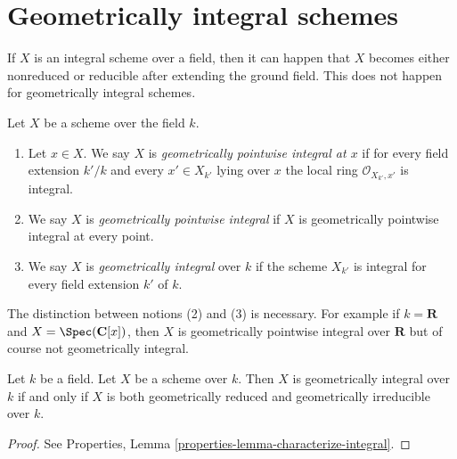 \section{Geometrically integral schemes}
\label{section-geometrically-integral}

\noindent
If $X$ is an integral scheme over a field, then it can happen that $X$
becomes either nonreduced or reducible after extending the ground field.
This does not happen for geometrically integral schemes.

\begin{definition}
\label{definition-geometrically-integral}
Let $X$ be a scheme over the field $k$.
\begin{enumerate}
\item Let $x \in X$. We say $X$ is
{\it geometrically pointwise integral at $x$} if for every
field extension $k'/k$ and every $x' \in X_{k'}$ lying over $x$
the local ring $\mathcal{O}_{X_{k'}, x'}$ is integral.
\item We say $X$ is {\it geometrically pointwise integral} if $X$
is geometrically pointwise integral at every point.
\item We say $X$ is {\it geometrically integral} over $k$ if the scheme
$X_{k'}$ is integral for every field extension $k'$ of $k$.
\end{enumerate}
\end{definition}

\noindent
The distinction between notions (2) and (3) is necessary.
For example if $k = \mathbf{R}$ and $X = \Spec(\mathbf{C}[x])$,
then $X$ is geometrically pointwise integral over $\mathbf{R}$ but
of course not geometrically integral.

\begin{lemma}
\label{lemma-geometrically-integral}
Let $k$ be a field.
Let $X$ be a scheme over $k$.
Then $X$ is geometrically integral over $k$ if and only if
$X$ is both geometrically reduced and geometrically irreducible
over $k$.
\end{lemma}

\begin{proof}
See Properties, Lemma \ref{properties-lemma-characterize-integral}.
\end{proof}

